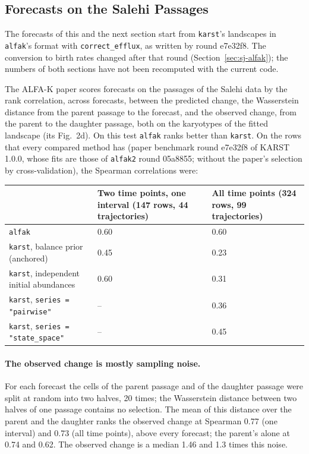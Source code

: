 \documentclass[11pt]{article}
\begin{document}
\subsection{Forecasts on the Salehi Passages}

The forecasts of this and the next section start from \texttt{karst}'s
landscapes in \texttt{alfak}'s format with \texttt{correct\_efflux}, as
written by round e7e32f8. The conversion to birth rates changed after that
round (Section~\ref{sec:sj-alfak}); the numbers of both sections have not been
recomputed with the current code.
\label{sec:salehi-noise}

The ALFA-K paper scores forecasts on the passages of the Salehi data by the
rank correlation, across forecasts, between the predicted change, the
Wasserstein distance from the parent passage to the forecast, and the observed
change, from the parent to the daughter passage, both on the karyotypes of the
fitted landscape (its Fig.~2d). On this test \texttt{alfak} ranks better than
\texttt{karst}. On the rows that every compared method has (paper benchmark
round e7e32f8 of KARST 1.0.0, whose fits are those of \texttt{alfak2} round
05a8855; without the paper's selection by cross-validation), the Spearman
correlations were:

\begin{center}
\begin{tabular}{L{0.42\textwidth}L{0.22\textwidth}L{0.22\textwidth}}
\toprule
 & Two time points, one interval (147 rows, 44 trajectories) & All time points (324 rows, 99 trajectories) \\
\midrule
\texttt{alfak} & 0.60 & 0.60 \\
\texttt{karst}, balance prior (anchored) & 0.45 & 0.23 \\
\texttt{karst}, independent initial abundances & 0.60 & 0.31 \\
\texttt{karst}, \texttt{series = "pairwise"} & -- & 0.36 \\
\texttt{karst}, \texttt{series = "state\_space"} & -- & 0.45 \\
\bottomrule
\end{tabular}
\end{center}

\paragraph{The observed change is mostly sampling noise.} For each forecast
the cells of the parent passage and of the daughter passage were split at
random into two halves, 20 times; the Wasserstein distance between two halves
of one passage contains no selection. The mean of this distance over the parent
and the daughter ranks the observed change at Spearman 0.77 (one interval) and
0.73 (all time points), above every forecast; the parent's alone at 0.74 and
0.62. The observed change is a median 1.46 and 1.3 times this noise.
\end{document}
